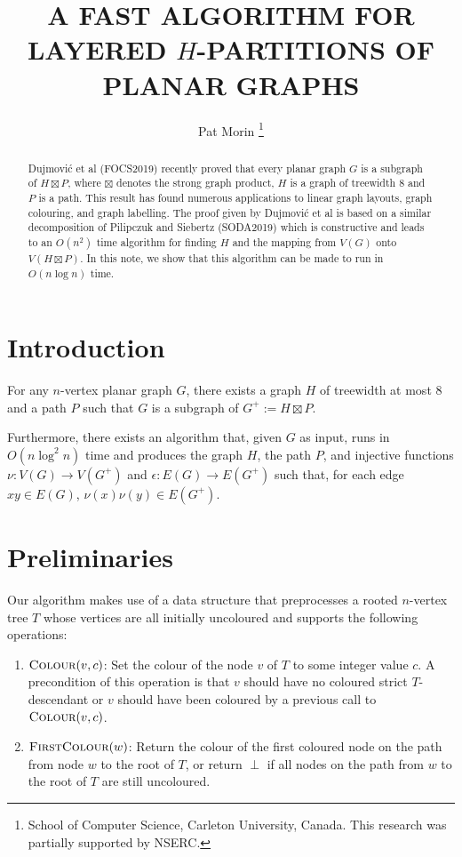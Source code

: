 \documentclass[kpfonts]{patmorin}
\title{\MakeUppercase{A Fast Algorithm for Layered $H$-Partitions of Planar Graphs}}
\author{
  Pat Morin%
    \thanks{School of Computer Science, Carleton University, Canada. This research was partially supported by NSERC.}
}
\begin{document}
\maketitle

\begin{abstract}
  Dujmović et al (FOCS2019) recently proved that every planar graph $G$ is a subgraph of $H\boxtimes P$, where $\boxtimes$ denotes the strong graph product, $H$ is a graph of treewidth 8 and $P$ is a path.  This result has found numerous applications to linear graph layouts, graph colouring, and graph labelling.  The proof given by Dujmović et al is based on a similar decomposition of Pilipczuk and Siebertz (SODA2019) which is constructive and leads to an $O(n^2)$ time algorithm for finding $H$ and the mapping from $V(G)$ onto $V(H\boxtimes P)$.  In this note, we show that this algorithm can be made to run in $O(n\log n)$ time.
\end{abstract}

\section{Introduction}

\begin{thm}
  For any $n$-vertex planar graph $G$, there exists a graph $H$ of treewidth at most 8 and a path $P$ such that $G$ is a subgraph of $G^+:=H\boxtimes P$.

  Furthermore, there exists an algorithm that, given $G$ as input, runs in $O(n\log^2 n)$ time and produces the graph $H$, the path $P$, and injective functions $\nu:V(G)\to V(G^+)$ and $\epsilon:E(G)\to E(G^+)$ such that, for each edge $xy\in E(G)$,  $\nu(x)\nu(y)\in E(G^+)$.
\end{thm}



\section{Preliminaries}



Our algorithm makes use of a data structure that preprocesses a rooted $n$-vertex tree $T$ whose vertices are all initially uncoloured and supports the following operations:
\begin{enumerate}
  \item $\textsc{Colour}(v,c)$: Set the colour of the node $v$ of $T$ to some integer value $c$.  A precondition of this operation is that $v$ should have no coloured strict $T$-descendant or $v$ should have been coloured by a previous call to $\textsc{Colour}(v,c)$.

  \item $\textsc{FirstColour}(w)$: Return the colour of the first coloured node on the path from node $w$ to the root of $T$, or return $\perp$ if all nodes on the path from $w$ to the root of $T$ are still uncoloured.
\end{enumerate}
\end{document}
